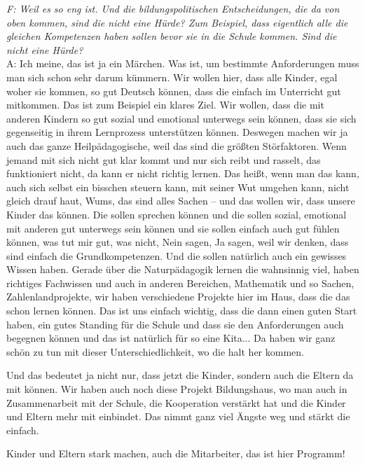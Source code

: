 \begin{linenumbers*}
\emph{F: Weil es so eng ist.
Und die bildungspolitischen Entscheidungen, die da von oben kommen, sind die nicht eine Hürde? Zum Beispiel, dass eigentlich alle die gleichen Kompetenzen haben sollen bevor sie in die Schule kommen. Sind die nicht eine Hürde?} \\
A: Ich meine, das ist ja ein Märchen. Was ist, um bestimmte Anforderungen muss man sich schon sehr darum kümmern. Wir wollen hier, dass alle Kinder, egal woher sie kommen, so gut Deutsch können, dass die einfach im Unterricht gut mitkommen. Das ist zum Beispiel ein klares Ziel. Wir wollen, dass die mit anderen Kindern so gut sozial und emotional unterwegs sein können, dass sie sich gegenseitig in ihrem Lernprozess unterstützen können. Deswegen machen wir ja auch das ganze Heilpädagogische, weil das sind die größten Störfaktoren. Wenn jemand mit sich nicht gut klar kommt und nur sich reibt und rasselt, das funktioniert nicht, da kann er nicht richtig lernen. Das heißt, wenn man das kann, auch sich selbst ein bisschen steuern kann, mit seiner Wut umgehen kann, nicht gleich drauf haut, Wums, das sind alles Sachen -- und das wollen wir, dass unsere Kinder das können. Die sollen sprechen können und die sollen sozial, emotional mit anderen gut unterwegs sein können und sie sollen einfach auch gut fühlen können, was tut mir gut, was nicht, Nein sagen, Ja sagen, weil wir denken, dass sind einfach die Grundkompetenzen. 
Und die sollen natürlich auch ein gewisses Wissen haben. Gerade über die Naturpädagogik lernen die wahnsinnig viel, haben richtiges Fachwissen und auch in anderen Bereichen, Mathematik und so Sachen, Zahlenlandprojekte, wir haben verschiedene Projekte hier im Haus, dass die das schon lernen können. Das ist uns einfach wichtig, dass die dann einen guten Start haben, ein gutes Standing für die Schule und dass sie den Anforderungen auch begegnen können und das ist natürlich für so eine Kita... Da haben wir ganz schön zu tun mit dieser Unterschiedlichkeit, wo die halt her kommen. 

Und das bedeutet ja nicht nur, dass jetzt die Kinder, sondern auch die Eltern da mit können. Wir haben auch noch diese Projekt Bildungshaus, wo man auch in Zusammenarbeit mit der Schule, die Kooperation verstärkt hat und die Kinder und Eltern mehr mit einbindet. Das nimmt ganz viel Ängste weg und stärkt die einfach. 

Kinder und Eltern stark machen, auch die Mitarbeiter, das ist hier Programm!
\end{linenumbers*}

